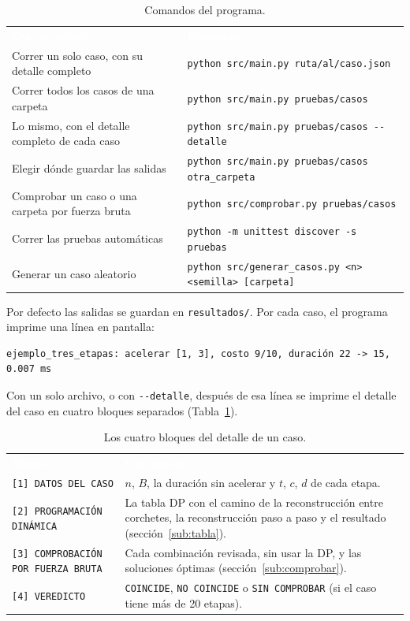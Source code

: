 \documentclass[11pt,a4paper]{article}
\newcommand{\cod}[1]{\texttt{#1}}
\newcommand{\encabezado}{\rowcolor{fondo}}
\newcommand{\blanco}[1]{\textcolor{white}{\textbf{#1}}}
\begin{document}
\begin{table}[H]
\centering\small
\renewcommand{\arraystretch}{1.2}
\begin{tabularx}{\textwidth}{@{}Xl@{}}
\encabezado \blanco{Qué se quiere} & \blanco{Comando} \\
Correr un solo caso, con su detalle completo & \cod{python src/main.py ruta/al/caso.json} \\
Correr todos los casos de una carpeta & \cod{python src/main.py pruebas/casos} \\
Lo mismo, con el detalle completo de cada caso & \cod{python src/main.py pruebas/casos -{}-detalle} \\
Elegir dónde guardar las salidas & \cod{python src/main.py pruebas/casos otra\_carpeta} \\
Comprobar un caso o una carpeta por fuerza bruta & \cod{python src/comprobar.py pruebas/casos} \\
Correr las pruebas automáticas & \cod{python -m unittest discover -s pruebas} \\
Generar un caso aleatorio & \cod{python src/generar\_casos.py <n> <semilla> [carpeta]} \\
\bottomrule
\end{tabularx}
\caption{Comandos del programa.}
\end{table}

Por defecto las salidas se guardan en \cod{resultados/}. Por cada caso, el programa imprime una línea en pantalla:

\begin{lstlisting}
ejemplo_tres_etapas: acelerar [1, 3], costo 9/10, duración 22 -> 15, 0.007 ms
\end{lstlisting}

Con un solo archivo, o con \cod{-{}-detalle}, después de esa línea se imprime el detalle del caso en cuatro bloques separados (Tabla~\ref{tab:bloques}).

\begin{table}[H]
\centering\small
\renewcommand{\arraystretch}{1.2}
\begin{tabularx}{\textwidth}{@{}lX@{}}
\encabezado \blanco{Bloque} & \blanco{Qué muestra} \\
\cod{[1] DATOS DEL CASO} & $n$, $B$, la duración sin acelerar y $t$, $c$, $d$ de cada etapa. \\
\cod{[2] PROGRAMACIÓN DINÁMICA} & La tabla DP con el camino de la reconstrucción entre corchetes, la reconstrucción paso a paso y el resultado (sección~\ref{sub:tabla}). \\
\cod{[3] COMPROBACIÓN POR FUERZA BRUTA} & Cada combinación revisada, sin usar la DP, y las soluciones óptimas (sección~\ref{sub:comprobar}). \\
\cod{[4] VEREDICTO} & \cod{COINCIDE}, \cod{NO COINCIDE} o \cod{SIN COMPROBAR} (si el caso tiene más de 20 etapas). \\
\bottomrule
\end{tabularx}
\caption{Los cuatro bloques del detalle de un caso.}
\label{tab:bloques}
\end{table}
\end{document}
